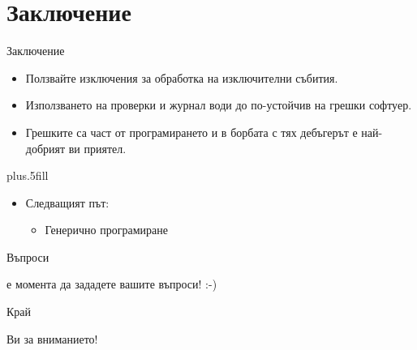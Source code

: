 \documentclass{beamer}
\begin{document}
\section*{Заключение}

\begin{frame}{Заключение}
  \transdissolve
  \begin{itemize}
  \item
    Ползвайте изключения за обработка на изключителни събития.
  \item
    Използването на проверки и журнал води до по-устойчив на грешки софтуер.
  \item
    Грешките са част от програмирането и в борбата с тях дебъгерът е
    най-добрият ви приятел.
  \end{itemize}
  
  \vskip0pt plus.5fill
  \begin{itemize}
  \item
    Следващият път:
    \begin{itemize}
    \item Генерично програмиране
    \end{itemize}
  \end{itemize}
\end{frame}

\begin{frame}{Въпроси}
  \transdissolve
  \begin{center}
     е момента да зададете вашите въпроси! :-)
  \end{center}
\end{frame}

\begin{frame}{Край}
  \transdissolve
  \begin{center}
     Ви за вниманието!
  \end{center}
\end{frame}
\end{document}
